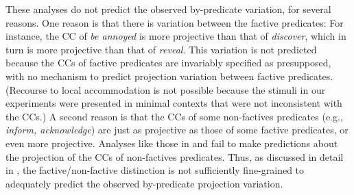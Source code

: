 \documentclass[a4paper,12pt,twoside]{article}
\begin{document}
These analyses do not predict the observed by-predicate variation, for several reasons. One reason is that there is variation between the factive predicates: For instance, the CC of \emph{be annoyed} is more projective than that of \emph{discover}, which in turn is more projective than that of \emph{reveal}. This variation is not predicted because the CCs of factive predicates are invariably specified as presupposed, with no mechanism to predict projection variation between factive predicates. (Recourse to local accommodation is not possible because the stimuli in our experiments were presented in minimal contexts that were not inconsistent with the CCs.)  A second reason is that the CCs of some non-factives predicates (e.g., \emph{inform, acknowledge})  are just as projective as those of some factive predicates, or even more projective. Analyses like those in \citealt{heim_projection_1983} and \citealt{van_der_sandt_presupposition_1992} fail to make predictions about the projection of the CCs of non-factives predicates. Thus, as discussed in detail in \citealt{degen_are_2022}, the factive/non-factive distinction is not sufficiently fine-grained to adequately predict the observed by-predicate projection variation.

 
\end{document}
